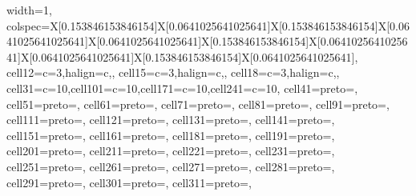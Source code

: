 \documentclass[
  letterpaper,
  DIV=11,
  numbers=noendperiod]{scrartcl}
\makeatletter
\renewenvironment{table}%
   {\renewcommand\familydefault\sfdefault
    \@float{table}}
   {\end@float}
\makeatother
\begin{document}
\begin{table}
{\centering
\begin{talltblr}[         %
entry=none,label=none,
note{}={Note: ATT = Average Treatment Effect on the Treated, CI = confidence interval},
]                     %
{                     %
width={1\linewidth},
colspec={X[0.153846153846154]X[0.0641025641025641]X[0.153846153846154]X[0.0641025641025641]X[0.0641025641025641]X[0.153846153846154]X[0.0641025641025641]X[0.0641025641025641]X[0.153846153846154]X[0.0641025641025641]},
cell{1}{2}={c=3,}{halign=c,},
cell{1}{5}={c=3,}{halign=c,},
cell{1}{8}={c=3,}{halign=c,},
cell{3}{1}={c=10}{},cell{10}{1}={c=10}{},cell{17}{1}={c=10}{},cell{24}{1}={c=10}{},
cell{4}{1}={preto={\hspace{1em}}},
cell{5}{1}={preto={\hspace{1em}}},
cell{6}{1}={preto={\hspace{1em}}},
cell{7}{1}={preto={\hspace{1em}}},
cell{8}{1}={preto={\hspace{1em}}},
cell{9}{1}={preto={\hspace{1em}}},
cell{11}{1}={preto={\hspace{1em}}},
cell{12}{1}={preto={\hspace{1em}}},
cell{13}{1}={preto={\hspace{1em}}},
cell{14}{1}={preto={\hspace{1em}}},
cell{15}{1}={preto={\hspace{1em}}},
cell{16}{1}={preto={\hspace{1em}}},
cell{18}{1}={preto={\hspace{1em}}},
cell{19}{1}={preto={\hspace{1em}}},
cell{20}{1}={preto={\hspace{1em}}},
cell{21}{1}={preto={\hspace{1em}}},
cell{22}{1}={preto={\hspace{1em}}},
cell{23}{1}={preto={\hspace{1em}}},
cell{25}{1}={preto={\hspace{1em}}},
cell{26}{1}={preto={\hspace{1em}}},
cell{27}{1}={preto={\hspace{1em}}},
cell{28}{1}={preto={\hspace{1em}}},
cell{29}{1}={preto={\hspace{1em}}},
cell{30}{1}={preto={\hspace{1em}}},
cell{31}{1}={preto={\hspace{1em}}},
}
\end{talltblr}}
\end{table}
\end{document}
